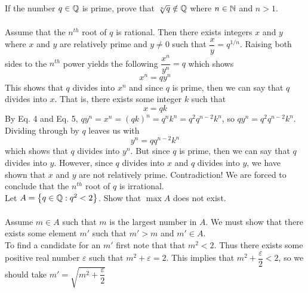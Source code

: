 \documentclass[12pt]{article}
\begin{document}
\problem If the number $q \in \mathbb{Q}$ is prime, prove that $\sqrt[n]{q} \notin \mathbb{Q}$ where $n \in \mathbb{N}$ and $n > 1$. \\ \\
Assume that the $n^{th} $ root of $q$ is rational. Then there exists integers $x$ and $y$ where $x $ and $y$ are relatively prime and $y \not = 0$ such that $\dfrac{x}{y} = q^{1/n}$. Raising both sides to the $n^{th}$ power yields the following $\dfrac{x^n}{y^n}=q$ which shows \begin{equation} x^n = qy^n
\end{equation}
This shows that $q$ divides into $x^n$ and since $q$ is prime, then we can say that $q$ divides into $x$. That is, there exists some integer $k$ such that \begin{equation}
x=qk
\end{equation} By Eq. 4 and Eq. 5, $qy^n=x^n=(qk)^n=q^nk^n=q^2q^{n-2}k^n$, so $qy^n=q^2q^{n-2}k^n$. Dividing through by $q$ leaves us with \begin{equation}
y^n=qq^{n-2}k^n
\end{equation} which shows that $q$ divides into $y^n$. But since $q$ is prime, then we can say that $q$ divides into $y$. However, since $q$ divides into $x$ and $q$ divides into $y$, we have shown that $x$ and $y$ are not relatively prime. Contradiction! We are forced to conclude that the  $n^{th} $ root of $q$ is irrational. \\

\problem Let $A = \left\{q \in \mathbb{Q} : q^2 < 2\right\}$. Show that $\max{A}$ does not exist. \\ \\
Assume $m \in A$ such that $m$ is the largest number in $A$. We must show that there exists some element $m'$ such that $m' > m$ and $m' \in A$. \\
To find a candidate for an $m'$ first note that that $m^2 < 2$. Thus there exists some positive real number $\varepsilon$ such that $m^2 + \varepsilon = 2$. This implies that $m^2 + \dfrac{\varepsilon}{2} < 2$, so we should take $m' = \sqrt{m^2 + \dfrac{\varepsilon}{2}}$
\end{document}
